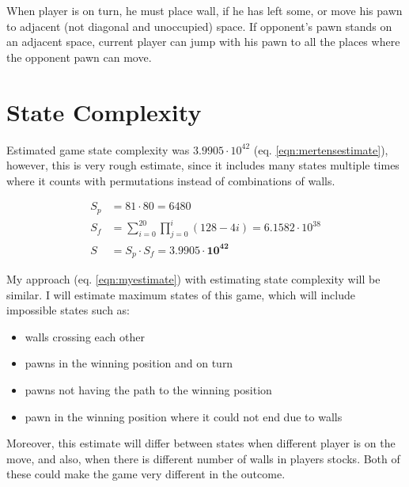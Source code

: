 When player is on turn, he must place wall, if he has left some, or move
his pawn to adjacent (not diagonal and unoccupied) space.
If opponent's pawn stands on an adjacent space, current player can jump
with his pawn to all the places where the opponent pawn can move.

\section{State Complexity}
Estimated game state complexity was $3.9905\cdot10^{42}$
\cite{mertens} (eq. \ref{eqn:mertensestimate}), however, this is very
rough estimate, since it includes many states multiple times where it counts
with permutations instead of combinations of walls.

\begin{center}
  \vspace*{-1.30cm}
  \begin{equation}
    \label{eqn:mertensestimate}
    \begin{aligned}
      S_p\!&=\!81 \cdot 80 = 6480 \\
      S_f\!&=\!\sum_{i=0}^{20}\prod_{j=0}^{i}(128 - 4i)\!=\!6.1582{\cdot}10^{38} \\
      S\!&=\!S_p \cdot S_f = \mathbf{3.9905 \cdot 10 ^{42}}
    \end{aligned}
  \end{equation}
  \vspace*{-1.15cm}
\end{center}

My approach (eq. \ref{eqn:myestimate}) with estimating state complexity
will be similar. I will estimate maximum states of this game, which will
include impossible states such as:
\begin{itemize}
  \vspace*{-0.25cm}
  \setlength\itemsep{0cm}
  \item walls crossing each other
  \item pawns in the winning position and on turn
  \item pawns not having the path to the winning position
  \item pawn in the winning position where it could not end due to walls
  \vspace*{-0.15cm}
\end{itemize}
Moreover, this estimate will differ between states when different
player is on the move, and also, when there is different number of walls
in players stocks. Both of these could make the game very different
in the outcome.

